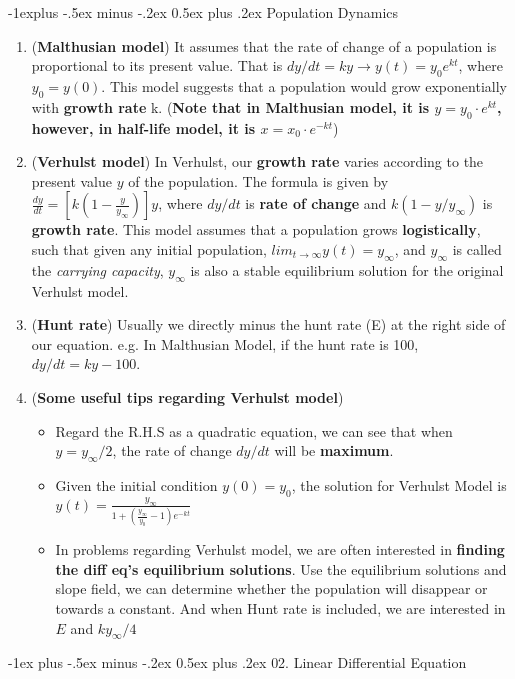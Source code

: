 \documentclass[10pt, landscape]{article}
\makeatletter
\renewcommand{\section}{\@startsection{section}{1}{0mm}%
                                {-1ex plus -.5ex minus -.2ex}%
                                {0.5ex plus .2ex}%
                                {\normalfont\large\bfseries}}
\renewcommand{\subsection}{\@startsection{subsection}{2}{0mm}%
                                {-1explus -.5ex minus -.2ex}%
                                {0.5ex plus .2ex}%
                                {\normalfont\normalsize\bfseries}}
\makeatother
\begin{document}
\begin{multicols}{4}
\subsection{Population Dynamics}
\begin{enumerate}
    \item (\textbf{Malthusian model}) It assumes that the rate of change of a population is proportional to its present value. That is $dy/dt=ky\rightarrow y(t)=y_0e^{kt}$, where $y_0=y(0)$. This model suggests that a population would grow exponentially with \textbf{growth rate} k. (\textbf{Note that in Malthusian model, it is $y=y_0\cdot e^{kt}$, however, in half-life model, it is $x=x_0\cdot e^{-kt}$})
    \item (\textbf{Verhulst model}) In Verhulst, our \textbf{growth rate} varies according to the present value $y$ of the population. The formula is given by $\frac{dy}{dt}=[k(1-\frac{y}{y_\infty})]y$, where $dy/dt$ is \textbf{rate of change} and $k(1-y/y_\infty)$ is \textbf{growth rate}. This model assumes that a population grows \textbf{logistically}, such that given any initial population, $lim_{t\to \infty}y(t)=y_\infty$, and $y_\infty$ is called the \textit{carrying capacity}, $y_\infty$ is also a stable equilibrium solution for the original Verhulst model.
    \item (\textbf{Hunt rate}) Usually we directly minus the hunt rate (E) at the right side of our equation. e.g. In Malthusian Model, if the hunt rate is 100, $dy/dt=ky-100$.
    \item (\textbf{Some useful tips regarding Verhulst model})
    \begin{itemize}
        \item Regard the R.H.S as a quadratic equation, we can see that when $y=y_\infty/2$, the rate of change $dy/dt$ will be \textbf{maximum}.
        \item Given the initial condition $y(0)=y_0$, the solution for Verhulst Model is $y(t)=\frac{y_\infty}{1+(\frac{y_\infty}{y_0}-1)e^{-kt}}$
        \item In problems regarding Verhulst model, we are often interested in \textbf{finding the diff eq's equilibrium solutions}. Use the equilibrium solutions and slope field, we can determine whether the population will disappear or towards a constant. And when Hunt rate is included, we are interested in $E$ and $ky_\infty/4$
    \end{itemize}
\end{enumerate}

\section{02. Linear Differential Equation}

\end{multicols}
\end{document}
